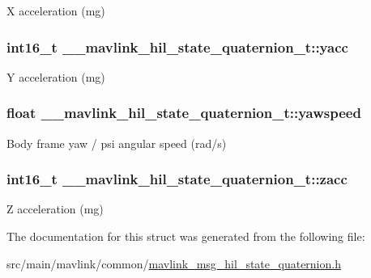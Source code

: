 X acceleration (mg) 

\hypertarget{struct____mavlink__hil__state__quaternion__t_a949a82c6d368468354dd201cda5458fa}{
\subsubsection[{yacc}]{\setlength{\rightskip}{0pt plus 5cm}int16\+\_\+t \+\_\+\+\_\+mavlink\+\_\+hil\+\_\+state\+\_\+quaternion\+\_\+t\+::yacc}}\label{struct____mavlink__hil__state__quaternion__t_a949a82c6d368468354dd201cda5458fa}


Y acceleration (mg) 

\hypertarget{struct____mavlink__hil__state__quaternion__t_ab3474522e90658e09da1a3bfaa235fab}{
\subsubsection[{yawspeed}]{\setlength{\rightskip}{0pt plus 5cm}float \+\_\+\+\_\+mavlink\+\_\+hil\+\_\+state\+\_\+quaternion\+\_\+t\+::yawspeed}}\label{struct____mavlink__hil__state__quaternion__t_ab3474522e90658e09da1a3bfaa235fab}


Body frame yaw / psi angular speed (rad/s) 

\hypertarget{struct____mavlink__hil__state__quaternion__t_a8e4533aa8c582bf609a813b65835fe52}{
\subsubsection[{zacc}]{\setlength{\rightskip}{0pt plus 5cm}int16\+\_\+t \+\_\+\+\_\+mavlink\+\_\+hil\+\_\+state\+\_\+quaternion\+\_\+t\+::zacc}}\label{struct____mavlink__hil__state__quaternion__t_a8e4533aa8c582bf609a813b65835fe52}


Z acceleration (mg) 



The documentation for this struct was generated from the following file\+:\begin{DoxyCompactItemize}
\item 
src/main/mavlink/common/\hyperlink{mavlink__msg__hil__state__quaternion_8h}{mavlink\+\_\+msg\+\_\+hil\+\_\+state\+\_\+quaternion.\+h}\end{DoxyCompactItemize}
